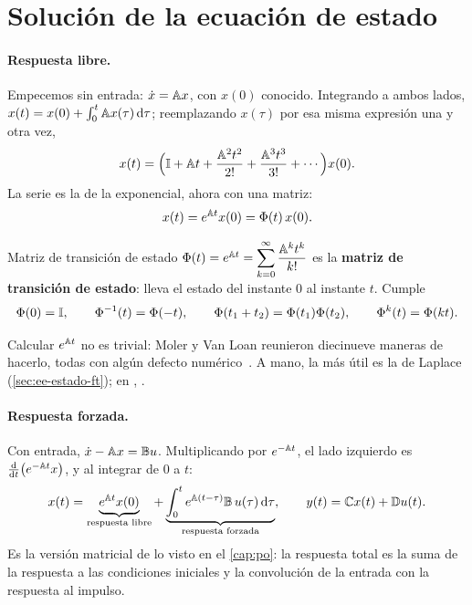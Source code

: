 \section{Solución de la ecuación de estado}
\label{sec:ee-solucion}

\paragraph{Respuesta libre.} Empecemos sin entrada: $\dot x=\mathbb{A} x$, con $x(0)$ conocido. Integrando a ambos lados, $x(t)=x(0)+\int_0^t\mathbb{A} x(\tau)\,\mathrm{d}\tau$; reemplazando $x(\tau)$ por esa misma expresión una y otra vez,
\[
  x(t)=\Bigl(\mathbb{I}+\mathbb{A} t+\frac{\mathbb{A}^2t^2}{2!}+\frac{\mathbb{A}^3t^3}{3!}+\cdots\Bigr)x(0).
\]
La serie es la de la exponencial, ahora con una matriz:
\begin{equation}
  x(t)=e^{\mathbb{A} t}x(0)=\Phi(t)\,x(0) .
  \label{eq:ee-libre}
\end{equation}

\begin{definicion}[label=def:ee-transicion]{Matriz de transición de estado}
$\Phi(t)=e^{\mathbb{A} t}=\displaystyle\sum_{k=0}^{\infty}\frac{\mathbb{A}^kt^k}{k!}$ es la \textbf{matriz de transición de estado}: lleva el estado del instante $0$ al instante $t$. Cumple
\[
  \Phi(0)=\mathbb{I},\qquad \Phi^{-1}(t)=\Phi(-t),\qquad \Phi(t_1+t_2)=\Phi(t_1)\Phi(t_2),\qquad \Phi^k(t)=\Phi(kt).
\]
\end{definicion}

Calcular $e^{\mathbb{A} t}$ no es trivial: Moler y Van Loan reunieron diecinueve maneras de hacerlo, todas con algún defecto numérico~\citep{MoLo78}. A mano, la más útil es la de Laplace (\cref{sec:ee-estado-ft}); en \matlab, .

\paragraph{Respuesta forzada.} Con entrada, $\dot x-\mathbb{A} x=\mathbb{B} u$. Multiplicando por $e^{-\mathbb{A} t}$, el lado izquierdo es $\frac{\mathrm{d} }{\mathrm{d} t}\bigl(e^{-\mathbb{A} t}x\bigr)$, y al integrar de $0$ a $t$:
\begin{equation}
  x(t)=\underbrace{e^{\mathbb{A} t}x(0)}_{\text{respuesta libre}}+\underbrace{\int_0^te^{\mathbb{A}(t-\tau)}\mathbb{B}\,u(\tau)\,\mathrm{d}\tau}_{\text{respuesta forzada}},
  \qquad y(t)=\mathbb{C} x(t)+\mathbb{D} u(t).
  \label{eq:ee-forzada}
\end{equation}
Es la versión matricial de lo visto en el \cref{cap:po}: la respuesta total es la suma de la respuesta a las condiciones iniciales y la convolución de la entrada con la respuesta al impulso.

